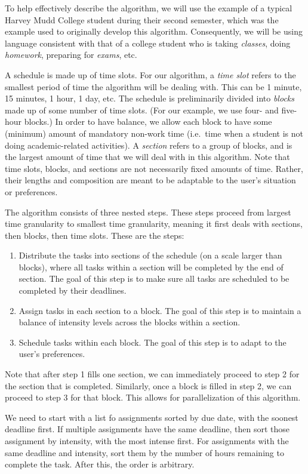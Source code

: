 \documentclass{article}
\begin{document}
	To help effectively describe the algorithm, we will use the example of a typical Harvey Mudd College student during their second semester, which was the example used to originally develop this algorithm.
	Consequently, we will be using language consistent with that of a college student who is taking \emph{classes}, doing \emph{homework}, preparing for \emph{exams}, etc.

	A schedule is made up of time slots. For our algorithm, a \emph{time slot} refers to the smallest period of time the algorithm will be dealing with. This can be 1 minute, 15 minutes, 1 hour, 1 day, etc.
	The schedule is preliminarily divided into \emph{blocks} made up of some number of time slots.
	(For our example, we use four- and five-hour blocks.)
	In order to have balance, we allow each block to have some (minimum) amount of mandatory non-work time (i.e.~time when a student is not doing academic-related activities).
	A \textit{section} refers to a group of blocks, and is the largest amount of time that we will deal with in this algorithm.
	Note that time slots, blocks, and sections are not necessarily fixed amounts of time.
	Rather, their lengths and composition are meant to be adaptable to the user's situation or preferences.

	The algorithm consists of three nested steps.
	These steps proceed from largest time granularity to smallest time granularity, meaning it first deals with sections, then blocks, then time slots.
	These are the steps:
	\begin{enumerate}
		\item Distribute the tasks into sections of the schedule (on a scale larger than blocks), where all tasks within a section will be completed by the end of section. The goal of this step is to make sure all tasks are scheduled to be completed by their deadlines.
		\item Assign tasks in each section to a block. The goal of this step is to maintain a balance of intensity levels across the blocks within a section.
		\item Schedule tasks within each block. The goal of this step is to adapt to the user's preferences.
	\end{enumerate}
	Note that after step 1 fills one section, we can immediately proceed to step 2 for the section that is completed.
	Similarly, once a block is filled in step 2, we can proceed to step 3 for that block.
	This allows for parallelization of this algorithm.
	
	We need to start with a list fo assignments sorted by due date, with the soonest deadline first.
	If multiple assignments have the same deadline, then sort those assignment by intensity, with the most intense first.
	For assignments with the same deadline and intensity, sort them by the number of hours remaining to complete the task.
	After this, the order is arbitrary.
\end{document}

